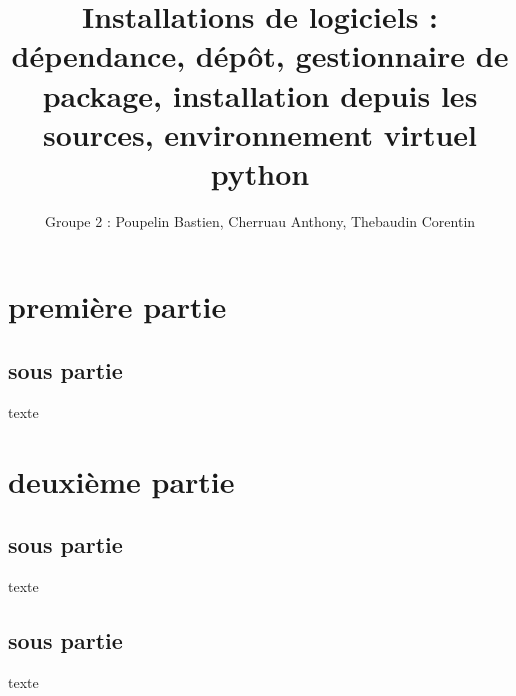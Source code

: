 \documentclass[a4paper,10pt]{article}
\title{\textbf{Installations de logiciels :} \\ dépendance, dépôt, gestionnaire de package, installation depuis les sources, environnement virtuel python}
\author{Groupe 2 : Poupelin Bastien, Cherruau Anthony, Thebaudin Corentin}
\date{}
\begin{document}
\maketitle

\tableofcontents


\section{première partie}

\subsection{sous partie}

texte


\section{deuxième partie}

\subsection{sous partie}

texte

\subsection{sous partie}

texte
\end{document}
